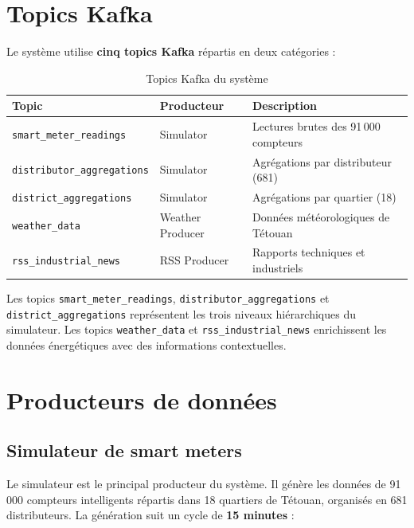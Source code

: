 \documentclass[12pt,a4paper]{report}
\begin{document}
\section{Topics Kafka}

Le système utilise \textbf{cinq topics Kafka} répartis en deux catégories :

\begin{table}[H]
\centering
\renewcommand{\arraystretch}{1.4}
\begin{tabular}{|l|l|l|}
\hline
\textbf{Topic} & \textbf{Producteur} & \textbf{Description} \\
\hline
\texttt{smart\_meter\_readings} & Simulator & Lectures brutes des 91\,000 compteurs \\
\hline
\texttt{distributor\_aggregations} & Simulator & Agrégations par distributeur (681) \\
\hline
\texttt{district\_aggregations} & Simulator & Agrégations par quartier (18) \\
\hline
\texttt{weather\_data} & Weather Producer & Données météorologiques de Tétouan \\
\hline
\texttt{rss\_industrial\_news} & RSS Producer & Rapports techniques et industriels \\
\hline
\end{tabular}
\caption{Topics Kafka du système}
\label{tab:kafka_topics}
\end{table}

Les topics \texttt{smart\_meter\_readings}, \texttt{distributor\_aggregations} et
\texttt{district\_aggregations} représentent les trois niveaux hiérarchiques du simulateur.
Les topics \texttt{weather\_data} et \texttt{rss\_industrial\_news} enrichissent les
données énergétiques avec des informations contextuelles.

\section{Producteurs de données}

\subsection{Simulateur de smart meters}

Le simulateur est le principal producteur du système. Il génère les données
de 91\,000 compteurs intelligents répartis dans 18 quartiers de Tétouan,
organisés en 681 distributeurs. La génération suit un cycle de \textbf{15 minutes} :
\end{document}
